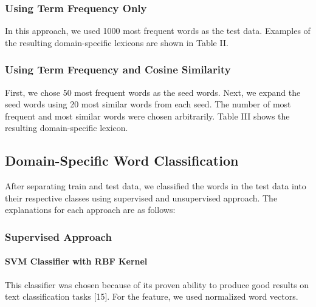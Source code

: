 \documentclass[a4paper,conference]{IEEEtran}
\begin{document}
\subsubsection{Using Term Frequency Only}
In this approach, we used 1000 most frequent words as the test data. Examples of the resulting domain-specific lexicons are shown in Table II.

\subsubsection{Using Term Frequency and Cosine Similarity}
First, we chose 50 most frequent words as the seed words. Next, we expand the seed words using 20 most similar words from each seed. The number of most frequent and most similar words were chosen arbitrarily. Table III shows the resulting domain-specific lexicon.

\subsection{Domain-Specific Word Classification}
After separating train and test data, we classified the words in the test data into their respective classes using supervised and unsupervised approach. The explanations for each approach are as follows:

\subsubsection{Supervised Approach}
\paragraph{SVM Classifier with RBF Kernel}
This classifier was chosen because of its proven ability to produce good results on text classification tasks [15]. For the feature, we used normalized word vectors.
\end{document}
